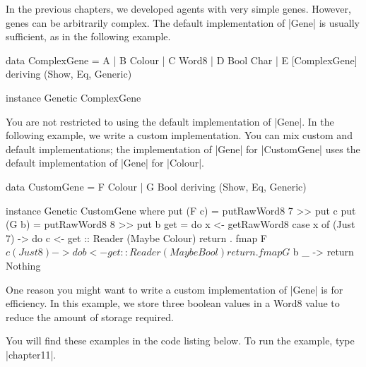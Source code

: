 In the previous chapters, we developed agents with very simple genes.
However, genes can be arbitrarily complex.
The default implementation of |Gene| is usually sufficient,
as in the following example.

\begin{code}
data ComplexGene = A | B Colour | C Word8 | D Bool Char | E [ComplexGene]
  deriving (Show, Eq, Generic)

instance Genetic ComplexGene
\end{code}

You are not restricted to using the default implementation of |Gene|.
In the following example, we write a custom implementation.
You can mix custom and default implementations;
the implementation of |Gene| for |CustomGene|
uses the default implementation of |Gene| for |Colour|.

\begin{code}
data CustomGene = F Colour | G Bool
  deriving (Show, Eq, Generic)

instance Genetic CustomGene where
  put (F c) = putRawWord8 7 >> put c
  put (G b) = putRawWord8 8 >> put b
  get = do
    x <- getRawWord8
    case x of
      (Just 7) -> do
        c <- get :: Reader (Maybe Colour)
        return . fmap F $ c
      (Just 8) -> do
        b <- get :: Reader (Maybe Bool)
        return . fmap G $ b
      _      -> return Nothing
\end{code}

One reason you might want to write a custom implementation of |Gene|
is for efficiency.
In this example, we store three boolean values in a Word8 value
to reduce the amount of storage required.
      

You will find these examples in the code listing below.
To run the example, type |chapter11|.
